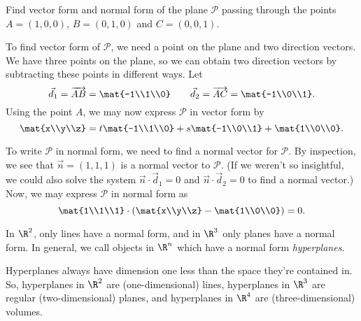 \begin{example}
	Find vector form and normal form of the plane $\mathcal P$ passing
	through the points $A=(1,0,0)$, $B=(0,1,0)$ and $C=(0,0,1)$.

	To find vector form of $\mathcal P$, we need a point on the plane and
	two direction vectors.  We have three points on the plane, so we can
	obtain two direction vectors by subtracting these points in different ways.
	Let
	\[
		\vec d_1=\overrightarrow{AB} = \mat{-1\\1\\0}\qquad\vec d_2=\overrightarrow{AC}=
		\mat{-1\\0\\1}.
	\]
	Using the point $A$, we may now express $\mathcal P$ in vector form by
	\[
		\mat{x\\y\\z} = t\mat{-1\\1\\0}+s\mat{-1\\0\\1}+\mat{1\\0\\0}.
	\]

	To write $\mathcal P$ in normal form, we need to find a normal vector for $\mathcal P$.  By inspection,
	we see that $\vec n=(1,1,1)$ is a normal vector to $\mathcal P$.  (If we weren't
	so insightful, we could also solve the system $\vec n\cdot \vec d_1=0$ and $\vec n\cdot\vec d_2=0$ to find a
	normal vector.)  Now, we may express $\mathcal P$ in normal form as
	\[
		\mat{1\\1\\1}\cdot\left(\mat{x\\y\\z}-\mat{1\\0\\0}\right)=0.
	\]
\end{example}

In $\R^2$, only lines have a normal form, and in $\R^3$ only planes have a normal form. In general,
we call objects in $\R^n$ which have a normal form \emph{hyperplanes}.


Hyperplanes always have dimension one less than the space they're contained in. So, hyperplanes in
$\R^2$ are (one-dimensional) lines, hyperplanes in $\R^3$ are regular (two-dimensional) planes, 
and hyperplanes in $\R^4$ are (three-dimensional) volumes.


